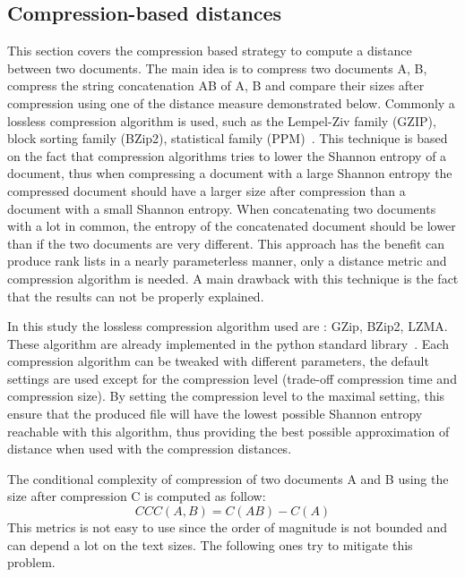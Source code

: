 \subsection{Compression-based distances \label{sec:compression_based_distances}}

This section covers the compression based strategy to compute a distance between two documents.
The main idea is to compress two documents A, B, compress the string concatenation AB of A, B and compare their sizes after compression using one of the distance measure demonstrated below.
Commonly a lossless compression algorithm is used, such as the Lempel-Ziv family (GZIP), block sorting family (BZip2), statistical family (PPM)~\cite{comparing_compression}.
This technique is based on the fact that compression algorithms tries to lower the Shannon entropy of a document, thus when compressing a document with a large Shannon entropy the compressed document should have a larger size after compression than a document with a small Shannon entropy.
When concatenating two documents with a lot in common, the entropy of the concatenated document should be lower than if the two documents are very different.
This approach has the benefit can produce rank lists in a nearly parameterless manner, only a distance metric and compression algorithm is needed.
A main drawback with this technique is the fact that the results can not be properly explained.

In this study the lossless compression algorithm used are : GZip, BZip2, LZMA. These algorithm are already implemented in the python standard library~\cite{python_standard_library}.
Each compression algorithm can be tweaked with different parameters, the default settings are used except for the compression level (trade-off compression time and compression size).
By setting the compression level to the maximal setting, this ensure that the produced file will have the lowest possible Shannon entropy reachable with this algorithm, thus providing the best possible approximation of distance when used with the compression distances.

\begin{definition}
  The conditional complexity of compression of two documents A and B using the size after compression C is computed as follow:
  \begin{equation}
    CCC(A, B) = C(AB) - C(A)
  \end{equation}
  This metrics is not easy to use since the order of magnitude is not bounded and can depend a lot on the text sizes.
  The following ones try to mitigate this problem.
\end{definition}

